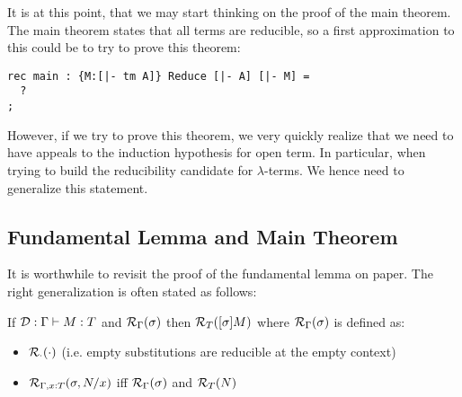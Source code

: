 It is at this point, that we may start thinking on the proof of the
main theorem. The main theorem states that all terms are reducible, so
a first approximation to this could be to try to prove this theorem:

\begin{lstlisting}
rec main : {M:[|- tm A]} Reduce [|- A] [|- M] =
  ?
;
\end{lstlisting}

However, if we try to prove this theorem, we very quickly realize that
we need to have appeals to the induction hypothesis for open term. In
particular, when trying to build the reducibility candidate for
$\lambda$-terms. We hence need to generalize this statement.

\subsection{Fundamental Lemma and Main Theorem}
It is worthwhile to revisit the proof of the fundamental lemma on
paper. The right generalization is often stated as follows:


\begin{lemma}
If ${\mathcal{D}}:\Gamma \vdash M : T$ and $\mathcal{R}_{\Gamma}(\sigma)$ then
$\mathcal{R}_{T}([\sigma]M)$ where $\mathcal{R}_{\Gamma}(\sigma)$ is defined as:

\begin{itemize}
\item $\mathcal{R}_{\cdot}(\cdot)$ (i.e. empty substitutions are reducible at the
  empty context)
\item $\mathcal{R}_{\Gamma, x:T}(\sigma, N/x)$ iff $\mathcal{R}_{\Gamma}(\sigma)$ and  $\mathcal{R}_{T}(N)$
\end{itemize}
\end{lemma}

